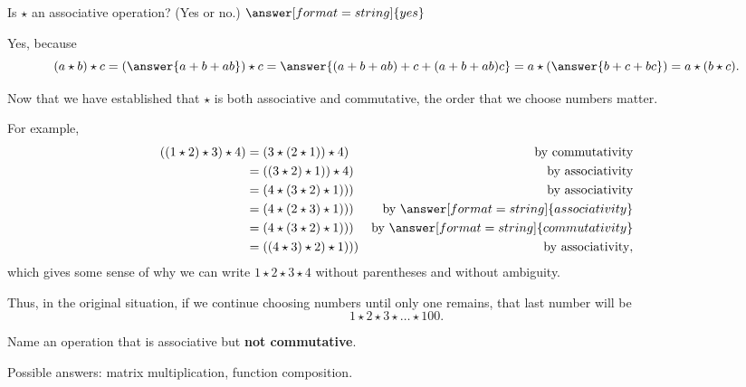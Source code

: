 \documentclass{ximera}
\begin{document}
\begin{problem}
Is $\star$ an associative operation?  (Yes or no.)  $\answer[format=string]{yes}$

\begin{explanation}
Yes, because 
\[
(a\star b)\star c =  \left(\answer{a+b+ab}\right)\star c = \answer{(a+b+ab)+c + (a+b+ab)c} 
 = a\star \left(\answer{b+c+bc}\right) = a \star(b\star c). 
 \]
\begin{question}
Now that we have established that $\star$ is both associative 
and commutative, the order that we choose numbers  matter.  

For example, 
\begin{align*}
((1\star 2)\star 3 )\star 4) &= (3\star (2\star 1))\star 4) &  \text{by commutativity} \\
                                        &= ((3\star 2)\star 1))\star 4) & \text{by associativity}  \\
                                        &= (4\star (3\star 2)\star 1))) & \text{by associativity}  \\
                                        &= (4\star (2\star 3)\star 1))) & \text{by }\answer[format=string]{associativity}  \\
                                        &= (4\star (3\star 2)\star 1))) & \text{by }\answer[format=string]{commutativity}  \\
                                        &= ((4\star 3)\star 2)\star 1))) & \text{by associativity},  \\
\end{align*}
which gives some sense of why we can write $1\star 2 \star 3 \star 4$ without parentheses and without ambiguity.  

Thus, in the original situation, if we continue choosing numbers until only one remains, that last number will be 
\[
1\star 2\star 3\star \dots \star 100. 
\]
\end{question}
\end{explanation}
\end{problem}

\begin{problem}
Name an operation that is associative but \textbf{not commutative}.  
\begin{freeResponse}
\begin{hint}
Possible answers: matrix multiplication, function composition.  
\end{hint}
\end{freeResponse}
\end{problem}
\end{document}
